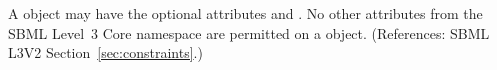 A \Constraint object may have the optional attributes   and
.  No other attributes from the SBML Level~3 Core namespace
are permitted on a \Constraint object.  (References: SBML L3V2
Section~\ref{sec:constraints}.)
